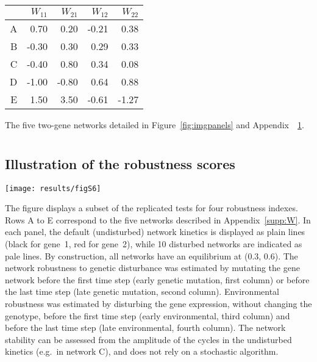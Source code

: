 \documentclass[10pt,a4paper]{article}
\newcommand{\SupMat}{Appendix~}
\begin{document}
\begin{appendices}
	\begin{center}
	\begin{tabular}{rrrrr}
	  \hline
	 & $W_{11}$ & $W_{21}$ & $W_{12}$ & $W_{22}$ \\ 
	  \hline
	  A & 0.70 & 0.20 & -0.21 & 0.38 \\ 
	  B & -0.30 & 0.30 & 0.29 & 0.33 \\ 
	  C & -0.40 & 0.80 & 0.34 & 0.08 \\ 
	  D & -1.00 & -0.80 & 0.64 & 0.88 \\ 
	  E & 1.50 & 3.50 & -0.61 & -1.27 \\ 
	   \hline
	\end{tabular}
	\end{center}
	{\color{Gray} The five two-gene networks detailed in Figure~\ref{fig:imgpanels} and \SupMat~\ref{supp:simpanels}.}

	
  \clearpage
  \section{}
    \label{supp:simpanels}
    \subsection*{Illustration of the robustness scores}

	\begin{adjustwidth}{-1in}{0in}
	\texttt{[image: results/figS6]}

	{\color{Gray} The figure displays a subset of the replicated tests for four robustness indexes. Rows A to E correspond to the five networks described in \SupMat \ref{supp:W}. In each panel, the default (undisturbed) network kinetics is displayed as plain lines (black for gene~1, red for gene~2), while 10 disturbed networks are indicated as pale lines. By construction, all networks have an equilibrium at (0.3, 0.6). The network robustness to genetic disturbance was estimated by mutating the gene network before the first time step (early genetic mutation, first column) or before the last time step (late genetic mutation, second column). Environmental robustness was estimated by disturbing the gene expression, without changing the genotype, before the first time step (early environmental, third column) and before the last time step (late environmental, fourth column). The network stability can be assessed from the amplitude of the cycles in the undisturbed kinetics (e.g.\ in network C), and does not rely on a stochastic algorithm.}
	\end{adjustwidth}



\end{appendices}
\end{document}
